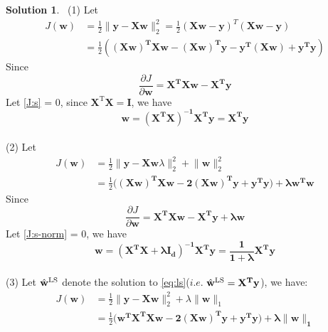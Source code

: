 \documentclass[a4paper,UTF8]{article}
\numberwithin{equation}{section}
\theoremstyle{definition}
\newtheorem*{solution}{Solution}
\begin{document}
\begin{solution} $\,$ \newline
(1)  Let 
\begin{equation}
\begin{split}
J(\mathbf{w}) &= \frac{1}{2} \lVert \mathbf{y} - \mathbf {X}\mathbf{w} \rVert_2^2 = \frac{1}{2} (\mathbf{Xw-y})^T(\mathbf{Xw-y}) \\
&= \frac{1}{2}  (\mathbf{	(Xw)^TXw-(Xw)^Ty-y^T(Xw)+y^Ty	})
\end{split}
\end{equation}
Since
\begin{equation}
\label{J:s}
\frac{\partial J}{\partial\mathbf{w}}=\mathbf{X^TXw-X^{T}y}
\end{equation}
Let  \eqref{J:s} = 0, since $\mathbf{X}^\mathrm{T}\mathbf{X} = \mathbf{I}$, we have
\begin{equation}
\mathbf{w}=\mathbf{(X^T X)^{-1}X^T y} = \mathbf{X^T y}
\end{equation}
~\\
(2)	Let 
\begin{equation}
\begin{split}
J(\mathbf{w}) &= \frac{1}{2}\lVert \mathbf{y} - \mathbf X \mathbf{w} \lambda \rVert_2^2 + \lVert \mathbf{w}\rVert_2^2 \\
&= \frac{1}{2} (\mathbf{(Xw)^TXw-2(Xw)^Ty+y^Ty)	 + \lambda w^Tw}
\end{split}
\end{equation}
Since
\begin{equation}
\label{J:s-norm}
\frac{\partial J}{\partial\mathbf{w}}=\mathbf{X^TXw-X^{T}y + \lambda w}
\end{equation}
Let  \eqref{J:s-norm} = 0, we have
\begin{equation}
\mathbf{w}=\mathbf{(X^T X + \lambda I_d)^{-1}X^T y}  = \mathbf{\frac{1}{1 + \lambda}X^T y} 
\end{equation}
~\\
\newcommand{\wls}{\hat{\mathbf{w}}^{{\small \text{LS}}}}
\newcommand{\boldw}{\mathbf{w}}
\newcommand{\wlasso}{\hat{\mathbf{w}}^{{\text{lasso}}}} 
(3) Let $\wls$ denote the solution to \eqref{eq:ls}($\textit{i.e.}$ $\wls = \mathbf{X^T y}$), we have:
\begin{equation}
\begin{split}
J(\mathbf{w})  &=  \frac{1}{2} \| \mathbf{y - X w} \|_2^2 + \lambda \| \mathbf{w}\|_1   \\
&=  \frac{1}{2} (\mathbf{w^TX^TXw-2(Xw)^Ty+y^Ty)	 + \lambda  \| \mathbf{w}\|_1  }  \\

\end{split}
\end{equation}
\end{solution}
\end{document}
